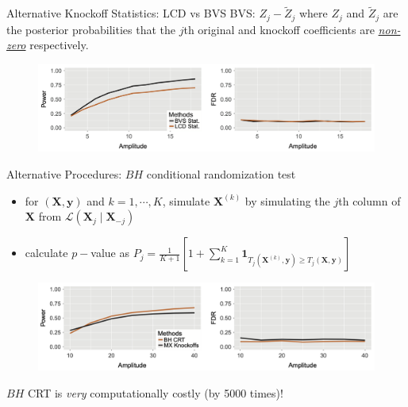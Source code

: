 \begin{frame}{Alternative Knockoff Statistics: LCD vs BVS}
    BVS: $Z_j-\tilde{Z}_j$ where $Z_j$ and $\tilde{Z}_j$ are the posterior probabilities that the $j$th original and knockoff coefficients are \textit{\underline{non-zero}} respectively.
    \begin{figure}\label{fig:BVS_vs_LCD}
        \centering
        \includegraphics[width = 0.95 \textwidth]{images/bvs_vs_lcd.png}
    \end{figure}
\end{frame}

\begin{frame}{Alternative Procedures: $BH$ conditional randomization test}

    {\footnotesize
    \begin{itemize}
        \item for $(\mathbf{X},\mathbf{y})$ and $k=1,\cdots,K$, simulate $\mathbf{X}^{(k)}$ by simulating the $j$th column of $\mathbf{X}$ from $\mathcal{L}(\mathbf{X}_j\mid \mathbf{X}_{-j})$
        \item calculate $p-$value as $ P_j = \frac{1}{K+1}\left[ 1+\sum^K_{k=1}\mathbf{1}_{T_j(\mathbf{X}^{(k)},\mathbf{y})\geq T_j(\mathbf{X},\mathbf{y})} \right] $
    \end{itemize}   }
    \vspace*{-10pt}
    \begin{figure}\label{fig:procedure1}
        \centering
        \includegraphics[width = 0.95 \textwidth]{images/altproced_1.png}
    \end{figure}
\vspace*{-5pt}
    \hfill $BH$ CRT is \textit{very} computationally costly (by 5000 times)!
\end{frame}

